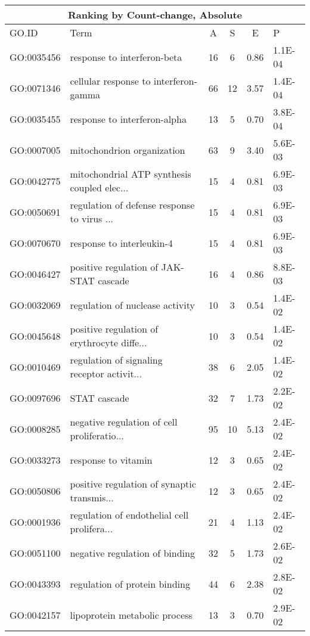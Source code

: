 \begin{table}[ht]
\centering
\begin{tabular}{llcccl}
\multicolumn{6}{c}{\bf Ranking by Count-change, Absolute} \\

  \hline
GO.ID & Term & A & S & E & P \\ 
  \hline
GO:0035456 & response to interferon-beta &  16 &   6 & 0.86 & 1.1E-04 \\ 
  GO:0071346 & cellular response to interferon-gamma &  66 &  12 & 3.57 & 1.4E-04 \\ 
  GO:0035455 & response to interferon-alpha &  13 &   5 & 0.70 & 3.8E-04 \\ 
  GO:0007005 & mitochondrion organization &  63 &   9 & 3.40 & 5.6E-03 \\ 
  GO:0042775 & mitochondrial ATP synthesis coupled elec... &  15 &   4 & 0.81 & 6.9E-03 \\ 
  GO:0050691 & regulation of defense response to virus ... &  15 &   4 & 0.81 & 6.9E-03 \\ 
  GO:0070670 & response to interleukin-4 &  15 &   4 & 0.81 & 6.9E-03 \\ 
  GO:0046427 & positive regulation of JAK-STAT cascade &  16 &   4 & 0.86 & 8.8E-03 \\ 
  GO:0032069 & regulation of nuclease activity &  10 &   3 & 0.54 & 1.4E-02 \\ 
  GO:0045648 & positive regulation of erythrocyte diffe... &  10 &   3 & 0.54 & 1.4E-02 \\ 
  GO:0010469 & regulation of signaling receptor activit... &  38 &   6 & 2.05 & 1.4E-02 \\ 
  GO:0097696 & STAT cascade &  32 &   7 & 1.73 & 2.2E-02 \\ 
  GO:0008285 & negative regulation of cell proliferatio... &  95 &  10 & 5.13 & 2.4E-02 \\ 
  GO:0033273 & response to vitamin &  12 &   3 & 0.65 & 2.4E-02 \\ 
  GO:0050806 & positive regulation of synaptic transmis... &  12 &   3 & 0.65 & 2.4E-02 \\ 
  GO:0001936 & regulation of endothelial cell prolifera... &  21 &   4 & 1.13 & 2.4E-02 \\ 
  GO:0051100 & negative regulation of binding &  32 &   5 & 1.73 & 2.6E-02 \\ 
  GO:0043393 & regulation of protein binding &  44 &   6 & 2.38 & 2.8E-02 \\ 
  GO:0042157 & lipoprotein metabolic process &  13 &   3 & 0.70 & 2.9E-02 \\ 

\end{tabular}
\end{table}
